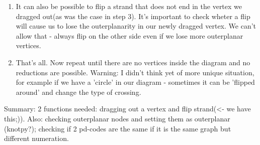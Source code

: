 \documentclass{article}
\begin{document}
\begin{enumerate}
\item It can also be possible to flip a strand that does not end in the vertex we dragged out(as was the case in step 3). It's important to check wheter a flip will cause us to lose the outerplanarity in our newly dragged vertex. We can't allow that - always flip on the other side even if we lose more outerplanar vertices.

\item That's all. Now repeat until there are no vertices inside the diagram and no reductions are possible.
Warning: I didn't think yet of more unique situation, for example if we have a 'circle' in our diagram - sometimes it can be 'flipped around' and change the type of crossing.
\end{enumerate}

Summary:
2 functions needed: dragging out a vertex and flip strand(<- we have this;)).
Also: checking outerplanar nodes and setting them as outerplanar (knotpy?); checking if 2 pd-codes are the same if it is the same graph but different numeration.
\end{document}
